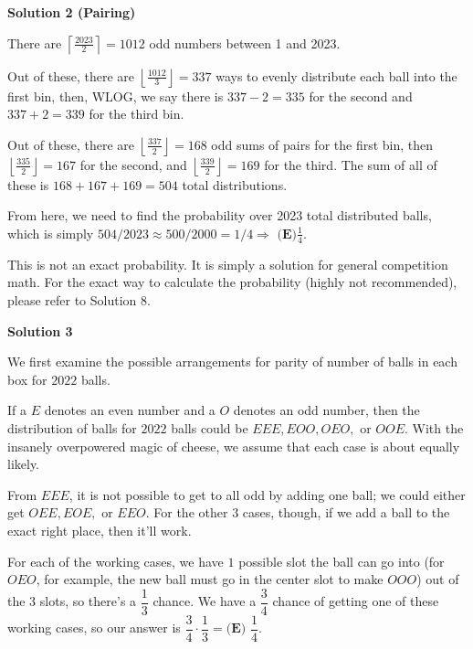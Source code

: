 \begin{enumerate}
 



\textbf{Solution 2 (Pairing)}

There are \( \left\lceil\frac{2023}{2}\right\rceil = 1012 \) odd numbers between 1 and 2023.

 Out of these, there are \( \left\lfloor\frac{1012}{3}\right\rfloor = 337 \) ways to evenly distribute each ball into the first bin, then, WLOG, we say there is \( 337 - 2 = 335 \) for the second and \( 337 + 2 = 339 \) for the third bin.

 Out of these, there are \( \left\lfloor\frac{337}{2}\right\rfloor = 168 \) odd sums of pairs for the first bin, then \( \left\lfloor\frac{335}{2}\right\rfloor = 167 \) for the second, and \( \left\lfloor\frac{339}{2}\right\rfloor = 169 \) for the third. The sum of all of these is \( 168 + 167 + 169 = 504 \) total distributions.

 From here, we need to find the probability over 2023 total distributed balls, which is simply \( 504/2023 \approx 500/2000 = 1/4 \Rightarrow \) $\boxed{\textbf{(E)} \frac{1}{4}}$.

 This is not an exact probability. It is simply a solution for general competition math. For the exact way to calculate the probability (highly not recommended), please refer to Solution 8.

 



\textbf{Solution 3}

We first examine the possible arrangements for parity of number of balls in each box for $2022$ balls.

 If a $E$ denotes an even number and a $O$ denotes an odd number, then the distribution of balls for $2022$ balls could be $EEE,EOO,OEO,$ or $OOE$. With the insanely overpowered magic of cheese, we assume that each case is about equally likely.

 From $EEE$, it is not possible to get to all odd by adding one ball; we could either get $OEE,EOE,$ or $EEO$. For the other $3$ cases, though, if we add a ball to the exact right place, then it'll work.

 For each of the working cases, we have $1$ possible slot the ball can go into (for $OEO$, for example, the new ball must go in the center slot to make $OOO$) out of the $3$ slots, so there's a $\dfrac13$ chance. We have a $\dfrac34$ chance of getting one of these working cases, so our answer is $\dfrac34\cdot\dfrac13=\boxed{\textbf{(E) }\dfrac14.}$





\end{enumerate}

